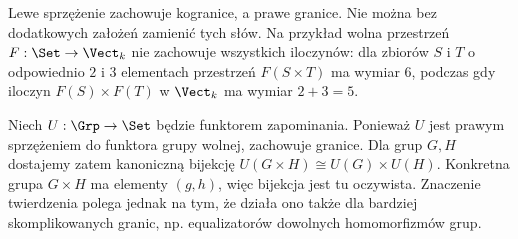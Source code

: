 \begin{uwaga}
Lewe sprzężenie zachowuje kogranice, a prawe granice. Nie można bez dodatkowych założeń zamienić tych słów. Na przykład wolna przestrzeń $F:\Set\to\Vect_k$ nie zachowuje wszystkich iloczynów: dla zbiorów $S$ i $T$ o odpowiednio $2$ i $3$ elementach przestrzeń $F(S\times T)$ ma wymiar $6$, podczas gdy iloczyn $F(S)\times F(T)$ w $\Vect_k$ ma wymiar $2+3=5$.
\end{uwaga}


\begin{przyklad}
Niech $U:\Grp\to\Set$ będzie funktorem zapominania. Ponieważ $U$ jest prawym sprzężeniem do funktora grupy wolnej, zachowuje granice. Dla grup $G,H$ dostajemy zatem kanoniczną bijekcję $U(G\times H)\cong U(G)\times U(H)$. Konkretna grupa $G\times H$ ma elementy $(g,h)$, więc bijekcja jest tu oczywista. Znaczenie twierdzenia polega jednak na tym, że działa ono także dla bardziej skomplikowanych granic, np. equalizatorów dowolnych homomorfizmów grup.
\end{przyklad}


